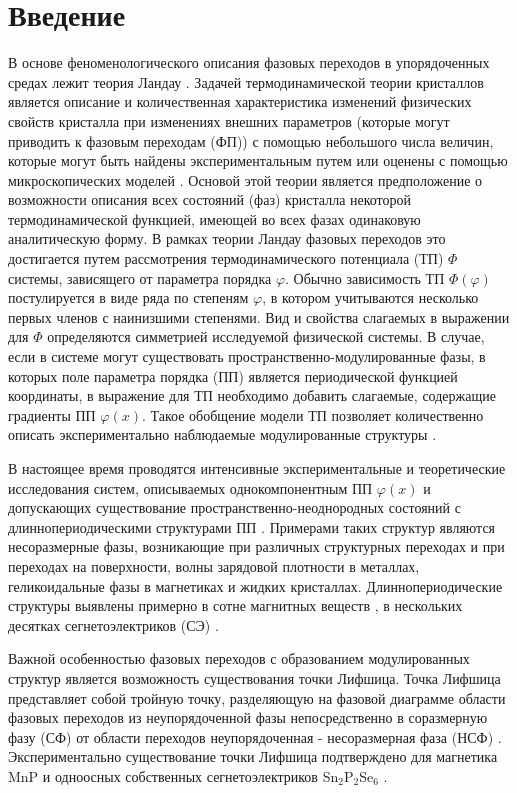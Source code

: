 
\chapter{Введение}\label{ch:intro}

В основе феноменологического описания фазовых переходов в упорядоченных средах лежит теория Ландау \cite{Landau1969, Toledano1994}.
Задачей термодинамической теории кристаллов является описание и количественная характеристика изменений физических свойств кристалла при изменениях внешних параметров (которые могут приводить к фазовым переходам (ФП)) с помощью небольшого числа величин, которые могут быть найдены экспериментальным путем или оценены с помощью микроскопических моделей \cite{Kholodenko1971}.
Основой этой теории является предположение о возможности описания всех состояний (фаз) кристалла некоторой термодинамической функцией, имеющей во всех фазах одинаковую аналитическую форму.
В рамках теории Ландау фазовых переходов это достигается путем рассмотрения термодинамического потенциала (ТП) $\Phi$ системы, зависящего от параметра порядка $\varphi$.
Обычно зависимость ТП  $\Phi(\varphi)$ постулируется в виде ряда по степеням $\varphi$, в котором учитываются несколько первых членов с наинизшими степенями.
Вид и свойства слагаемых в выражении для $\Phi$ определяются симметрией исследуемой физической системы.
В случае, если в системе могут существовать пространственно-модулированные фазы, в которых поле параметра порядка (ПП) является периодической функцией координаты, в выражение для ТП необходимо добавить слагаемые, содержащие градиенты ПП $\varphi(x)$.
Такое обобщение модели ТП позволяет количественно описать экспериментально наблюдаемые модулированные структуры \cite{Cummins1990, Vysochanskii1994}.

В настоящее время проводятся интенсивные экспериментальные и теоретические исследования систем, описываемых однокомпонентным ПП $\varphi(x)$ и допускающих существование пространственно-неоднородных состояний с длиннопериодическими структурами ПП \cite{Toledano1994, Cummins1990, Vysochanskii1992}.
Примерами таких структур являются несоразмерные фазы, возникающие при различных структурных переходах и при переходах на поверхности, волны зарядовой плотности в металлах, геликоидальные фазы в магнетиках и жидких кристаллах.
Длиннопериодические структуры выявлены примерно в сотне магнитных веществ \cite{Izjumov1987}, в нескольких десятках сегнетоэлектриков (СЭ) \cite{Cummins1990}.

Важной особенностью фазовых переходов с образованием модулированных структур является возможность существования точки Лифшица.
Точка Лифшица представляет собой тройную точку, разделяющую на фазовой диаграмме области фазовых переходов из неупорядоченной фазы непосредственно в соразмерную фазу (СФ) от области переходов неупорядоченная - несоразмерная фаза (НСФ) \cite{Cummins1990, Vysochanskii1992}.
Экспериментально существование точки Лифшица подтверждено для магнетика MnP и одноосных собственных сегнетоэлектриков Sn$_2$P$_2$Se$_6$ \cite{Vysochanskii1992}.
